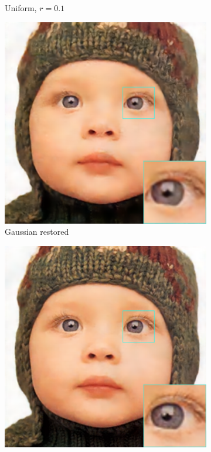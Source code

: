 \begin{figure}
\begin{subfigure}{0.24\textwidth}
		\caption{Uniform, $r=0.1$}
	\end{subfigure}
	\begin{subfigure}{0.24\textwidth}
		\includegraphics[width=\textwidth]{images/exp2.1/gaussian.png}
		\caption{Gaussian restored}
	\end{subfigure}
	\begin{subfigure}{0.24\textwidth}
		\includegraphics[width=\textwidth]{images/exp2.1/poisson.png}

\end{subfigure}
\end{figure}
